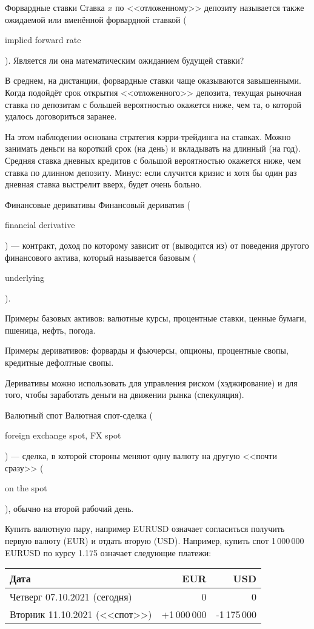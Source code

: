 \documentclass{beamer}
\newcommand{\en}[1]{\begin{otherlanguage}{english}#1\end{otherlanguage}}
\begin{document}
\begin{frame}{Форвардные ставки}
\justify 
Ставка $x$ по <<отложенному>> депозиту называется также ожидаемой или вменённой форвардной ставкой (\en{implied forward rate}). Является ли она математическим ожиданием будущей ставки?

\justify
В среднем, на дистанции, форвардные ставки чаще оказываются завышенными. Когда подойдёт срок открытия <<отложенного>> депозита, текущая рыночная ставка по депозитам с большей вероятностью окажется ниже, чем та, о которой удалось договориться заранее. 

\justify
На этом наблюдении основана стратегия кэрри-трейдинга на ставках. Можно занимать деньги на короткий срок (на день) и вкладывать на длинный (на год). Средняя ставка дневных кредитов с большой вероятностью окажется ниже, чем ставка по длинном депозиту. Минус: если случится кризис и хотя бы один раз дневная ставка выстрелит вверх, будет очень больно.
\end{frame}



\begin{frame}{Финансовые деривативы}
\justify
Финансовый дериватив (\en{financial derivative}) --- контракт, доход по которому зависит 
от (выводится из) от поведения другого финансового актива, который называется базовым 
(\en{underlying}).

\justify
Примеры базовых активов: валютные курсы, процентные ставки, ценные бумаги, пшеница, нефть, погода.

\justify
Примеры деривативов: форварды и фьючерсы, опционы, процентные свопы, кредитные дефолтные свопы.

\justify
Деривативы можно использовать для управления риском (хэджирование) и для того, чтобы заработать деньги на движении рынка (спекуляция). 
\end{frame}



\begin{frame}{Валютный спот}
\justify
Валютная спот-сделка (\en{foreign exchange spot, FX spot}) --- сделка, в которой стороны меняют одну валюту на другую <<почти сразу>> (\en{on the spot}), обычно на второй рабочий день.

\justify
Купить валютную пару, например EURUSD означает согласиться получить первую валюту (EUR) и отдать вторую (USD). Например, купить спот 1\,000\,000 EURUSD по курсу 1.175 означает следующие платежи:

\centering
\begin{tabular}{l|r|r}
Дата                          & EUR & USD \\ \hline
Четверг 07.10.2021 (сегодня)  & 0   & 0   \\
Вторник 11.10.2021 (<<спот>>) & +1\,000\,000 & -1\,175\,000 
\end{tabular}
\end{frame}
\end{document}
